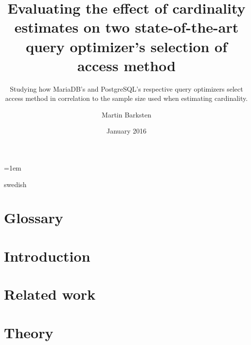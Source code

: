 \documentclass[a4paper,11pt]{kth-mag}
\title{Evaluating the effect of cardinality estimates on two state-of-the-art query optimizer's selection of access method}
\subtitle{Studying how MariaDB's and PostgreSQL's respective query optimizers
  select access method in correlation to the sample size used when estimating cardinality.}
\author{Martin Barksten}
\date{January 2016}
\begin{document}
\lstset{basicstyle=\ttfamily,breaklines=true}
\lstset{frame=lines}
\emergencystretch=1em
\pgfplotsset{width=10cm, compat=1.9}
\tabulinesep=1.2mm

\newcommand{\json}[5]{
  \inputminted[breaklines, breakanywhere, fontsize=\footnotesize]{json}{#1}
  \captionof{listing}{The output when testing #2 with query #3, a sample size of
  #4 and #5 repetitions.}
}
\newcommand{\clj}[1]{\texttt{#1}}
\newcommand{\sql}[1]{\texttt{#1}}
\newenvironment{indexgraph}{
  \begin{tikzpicture}
    \begin{axis}[
      ybar,
      legend style={at={(0.5,-0.15)},
        anchor=north,legend columns=-1},
      symbolic x coords={ct,t,mt,mm,book,cmt,cmm,est,resamb},
      ylabel={\#access methods},
      xtick=data,
      nodes near coords,
      nodes near coords align={vertical},
      width=14cm]
} {
  \legend{Possible access methods, MariaDB, PostgreSQL}
\end{axis}
\end{tikzpicture}
}

\frontmatter
\pagestyle{empty}
\removepagenumbers{}
\maketitle
{}
\begin{abstract}
    
\end{abstract}
\clearpage
\begin{foreignabstract}{swedish}
    
\end{foreignabstract}
\clearpage
\tableofcontents*
\clearpage
\listoffigures
\mainmatter{}
\pagestyle{newchap}

\chapter*{Glossary}\label{chap:glossary}
    
\chapter{Introduction}\label{chap:introduction}
    
\chapter{Related work}\label{chap:relatedwork}
    
\chapter{Theory}\label{chap:theory}
    
\end{document}
